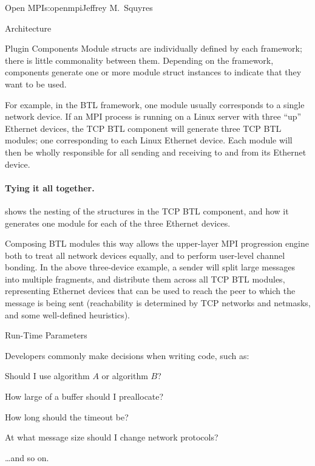 \begin{aosachapter}{Open MPI}{s:openmpi}{Jeffrey M.\ Squyres}
\begin{aosasect1}{Architecture}
\begin{aosasect2}{Plugin Components}
Module structs are individually defined by each framework; there is
little commonality between them.
%
Depending on the framework, components generate one or more module
struct instances to indicate that they want to be used.

For example, in the BTL framework, one module usually corresponds to a
single network device.  
%
If an MPI process is running on a Linux server with three ``up''
Ethernet devices, the TCP BTL component will generate three TCP BTL
modules; one corresponding to each Linux Ethernet device.
%
Each module will then be wholly responsible for all sending and
receiving to and from its Ethernet device.


\paragraph{Tying it all together.}
 shows the nesting of the
structures in the TCP BTL component, and how it generates one module
for each of the three Ethernet devices.


Composing BTL modules this way allows the upper-layer MPI progression
engine both to treat all network devices equally, and to perform
user-level channel bonding.  
%
In the above three-device example, a sender will split large messages
into multiple fragments, and distribute them across all TCP BTL
modules, representing Ethernet devices that can be used to reach the
peer to which the message is being sent (reachability is determined by
TCP networks and netmasks, and some well-defined heuristics).

\end{aosasect2}


\begin{aosasect2}{Run-Time Parameters}

Developers commonly make decisions when writing code, such as:

\begin{aosaitemize}
\item Should I use algorithm $A$ or algorithm $B$?
\item How large of a buffer should I preallocate?
\item How long should the timeout be?
\item At what message size should I change network protocols?
\item {\ldots}and so on.
\end{aosaitemize}


\end{aosasect2}
\end{aosasect1}
\end{aosachapter}
